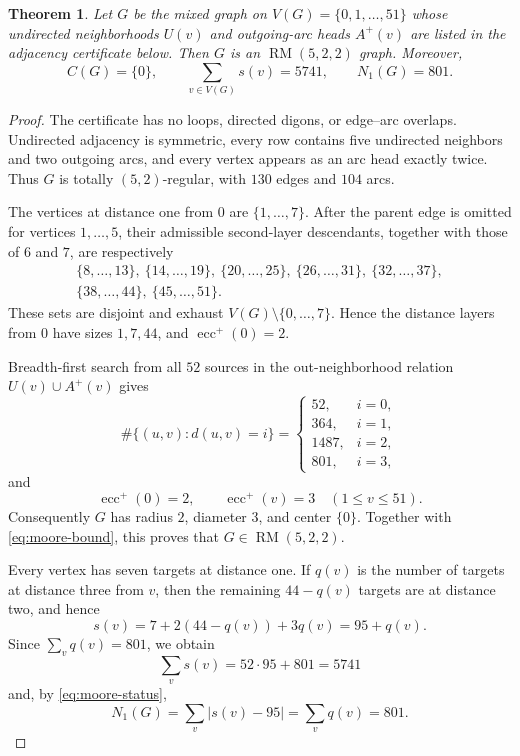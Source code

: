 \documentclass[11pt]{amsart}
\newtheorem{theorem}{Theorem}
\newcommand{\RM}{\operatorname{RM}}
\begin{document}
\begin{theorem}\label{thm:main}
Let $G$ be the mixed graph on $V(G)=\{0,1,\ldots,51\}$ whose undirected
neighborhoods $U(v)$ and outgoing-arc heads $A^+(v)$ are listed in the
adjacency certificate below. Then $G$ is an $\RM(5,2,2)$ graph. Moreover,
\[
C(G)=\{0\},\qquad
\sum_{v\in V(G)}s(v)=5741,\qquad
N_1(G)=801.
\]
\end{theorem}

\begin{proof}
The certificate has no loops, directed digons, or edge--arc overlaps.
Undirected adjacency is symmetric, every row contains five undirected
neighbors and two outgoing arcs, and every vertex appears as an arc head
exactly twice. Thus $G$ is totally $(5,2)$-regular, with $130$ edges and
$104$ arcs.

The vertices at distance one from $0$ are $\{1,\ldots,7\}$. After the
parent edge is omitted for vertices $1,\ldots,5$, their admissible
second-layer descendants, together with those of $6$ and $7$, are
respectively
\[
\begin{gathered}
\{8,\ldots,13\},\ \{14,\ldots,19\},\ \{20,\ldots,25\},
\ \{26,\ldots,31\},\ \{32,\ldots,37\},\\
\{38,\ldots,44\},\ \{45,\ldots,51\}.
\end{gathered}
\]
These sets are disjoint and exhaust $V(G)\setminus\{0,\ldots,7\}$.
Hence the distance layers from $0$ have sizes $1,7,44$, and
$\operatorname{ecc}^+(0)=2$.

Breadth-first search from all $52$ sources in the out-neighborhood
relation $U(v)\cup A^+(v)$ gives
\[
\#\{(u,v):d(u,v)=i\}=
\begin{cases}
52,&i=0,\\
364,&i=1,\\
1487,&i=2,\\
801,&i=3,
\end{cases}
\]
and
\[
\operatorname{ecc}^+(0)=2,
\qquad
\operatorname{ecc}^+(v)=3\quad(1\le v\le51).
\]
Consequently $G$ has radius $2$, diameter $3$, and center $\{0\}$.
Together with \eqref{eq:moore-bound}, this proves that
$G\in\RM(5,2,2)$.

Every vertex has seven targets at distance one. If $q(v)$ is the number
of targets at distance three from $v$, then the remaining $44-q(v)$
targets are at distance two, and hence
\[
s(v)=7+2(44-q(v))+3q(v)=95+q(v).
\]
Since $\sum_v q(v)=801$, we obtain
\[
\sum_v s(v)=52\cdot95+801=5741
\]
and, by \eqref{eq:moore-status},
\[
N_1(G)=\sum_v\lvert s(v)-95\rvert
      =\sum_v q(v)
      =801.
\]
\end{proof}
\end{document}
